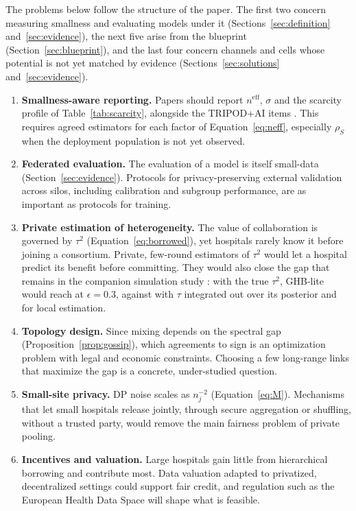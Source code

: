 \documentclass[acmsmall,screen,review]{acmart}
\newcommand{\eff}{\mathrm{eff}}
\theoremstyle{acmdefinition}
\begin{document}
The problems below follow the structure of the paper. The first two concern measuring smallness and evaluating models under it (Sections~\ref{sec:definition} and~\ref{sec:evidence}), the next five arise from the blueprint (Section~\ref{sec:blueprint}), and the last four concern channels and cells whose potential is not yet matched by evidence (Sections~\ref{sec:solutions} and~\ref{sec:evidence}).
\begin{enumerate}[leftmargin=*,itemsep=3pt]
\item \textbf{Smallness-aware reporting.} Papers should report $n^{\eff}$, $\sigma$ and the scarcity profile of Table~\ref{tab:scarcity}, alongside the TRIPOD+AI items \cite{collins2024tripod}. This requires agreed estimators for each factor of Equation~\eqref{eq:neff}, especially $\rho_S$ when the deployment population is not yet observed.
\item \textbf{Federated evaluation.} The evaluation of a model is itself small-data (Section~\ref{sec:evidence}). Protocols for privacy-preserving external validation across silos, including calibration and subgroup performance, are as important as protocols for training.
\item \textbf{Private estimation of heterogeneity.} The value of collaboration is governed by $\tau^2$ (Equation~\eqref{eq:borrowed}), yet hospitals rarely know it before joining a consortium. Private, few-round estimators of $\tau^2$ would let a hospital predict its benefit before committing. They would also close the gap that remains in the companion simulation study \cite{simoes2026ghb}: with the true $\tau^2$, GHB-lite would reach \SimFifteenStrictOracle{} at $\epsilon=0.3$, against \SimFifteenStrictGHB{} with $\tau$ integrated out over its posterior and \SimFifteenStrictLocal{} for local estimation.
\item \textbf{Topology design.} Since mixing depends on the spectral gap (Proposition~\ref{prop:gossip}), which agreements to sign is an optimization problem with legal and economic constraints. Choosing a few long-range links that maximize the gap is a concrete, under-studied question.
\item \textbf{Small-site privacy.} DP noise scales as $n_j^{-2}$ (Equation~\eqref{eq:M}). Mechanisms that let small hospitals release jointly, through secure aggregation or shuffling, without a trusted party, would remove the main fairness problem of private pooling.
\item \textbf{Incentives and valuation.} Large hospitals gain little from hierarchical borrowing and contribute most. Data valuation \cite{ghorbani2019data} adapted to privatized, decentralized settings could support fair credit, and regulation such as the European Health Data Space \cite{ehds2025} will shape what is feasible.

\end{enumerate}
\end{document}

